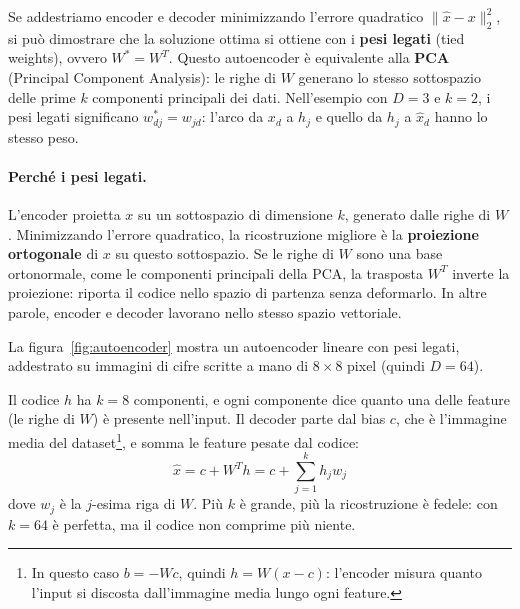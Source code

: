 Se addestriamo encoder e decoder minimizzando l'errore quadratico $\|\hat{x} - x\|_2^2$, si può dimostrare che la soluzione ottima si ottiene con i \textbf{pesi legati} (tied weights), ovvero $W^* = W^T$. Questo autoencoder è equivalente alla \textbf{PCA} (Principal Component Analysis): le righe di $W$ generano lo stesso sottospazio delle prime $k$ componenti principali dei dati. Nell'esempio con $D = 3$ e $k = 2$, i pesi legati significano $w^*_{dj} = w_{jd}$: l'arco da $x_d$ a $h_j$ e quello da $h_j$ a $\hat{x}_d$ hanno lo stesso peso.

\paragraph{Perché i pesi legati.} L'encoder proietta $x$ su un sottospazio di dimensione $k$, generato dalle righe di $W$. Minimizzando l'errore quadratico, la ricostruzione migliore è la \textbf{proiezione ortogonale} di $x$ su questo sottospazio. Se le righe di $W$ sono una base ortonormale, come le componenti principali della PCA, la trasposta $W^T$ inverte la proiezione: riporta il codice nello spazio di partenza senza deformarlo. In altre parole, encoder e decoder lavorano nello stesso spazio vettoriale.

La figura~\ref{fig:autoencoder} mostra un autoencoder lineare con pesi legati, addestrato su immagini di cifre scritte a mano di $8 \times 8$ pixel (quindi $D = 64$).

Il codice $h$ ha $k = 8$ componenti, e ogni componente dice quanto una delle feature (le righe di $W$) è presente nell'input. Il decoder parte dal bias $c$, che è l'immagine media del dataset\footnote{In questo caso $b = -Wc$, quindi $h = W(x - c)$: l'encoder misura quanto l'input si discosta dall'immagine media lungo ogni feature.}, e somma le feature pesate dal codice:
\[
    \hat{x} = c + W^T h = c + \sum_{j=1}^{k} h_j w_j
\]
dove $w_j$ è la $j$-esima riga di $W$. Più $k$ è grande, più la ricostruzione è fedele: con $k = 64$ è perfetta, ma il codice non comprime più niente.

